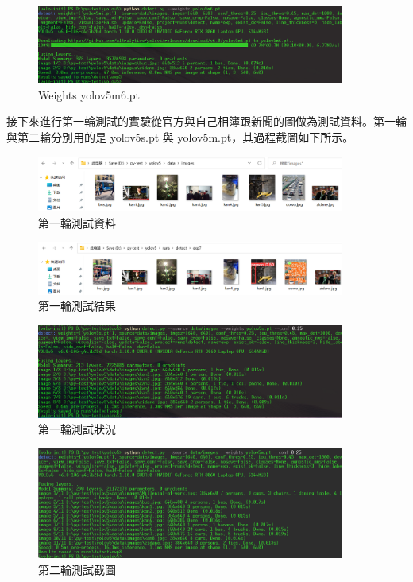\documentclass[10pt,UTF8]{ctexart}
\begin{document}
\begin{figure}[H]
\centering 
\includegraphics[width=0.90\textwidth]{n3.png} 
\caption{Weights yolov5m6.pt}
\label{Test}
\end{figure}

接下來進行第一輪測試的實驗從官方與自己相簿跟新聞的圖做為測試資料。第一輪與第二輪分別用的是 yolov5s.pt 與 yolov5m.pt，其過程截圖如下所示。

\begin{figure}[H]
\centering 
\includegraphics[width=0.90\textwidth]{n4.png} 
\caption{第一輪測試資料}
\label{Test}
\end{figure}

\begin{figure}[H]
\centering 
\includegraphics[width=0.90\textwidth]{n5.png} 
\caption{第一輪測試結果}
\label{Test}
\end{figure}

\begin{figure}[H]
\centering 
\includegraphics[width=0.90\textwidth]{n6.png} 
\caption{第一輪測試狀況}
\label{Test}
\end{figure}

\begin{figure}[H]
\centering 
\includegraphics[width=0.90\textwidth]{n7.png} 
\caption{第二輪測試截圖}
\label{Test}
\end{figure}
\end{document}
